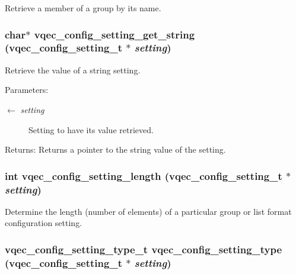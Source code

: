 Retrieve a member of a group by its name. 
\subsubsection{\setlength{\rightskip}{0pt plus 5cm}char$\ast$ vqec\_\-config\_\-setting\_\-get\_\-string (\bf{vqec\_\-config\_\-setting\_\-t} $\ast$ {\em setting})}\label{vqec__config__parser_8c_3b1a12dff91d6b592b26b497ee6bcefe}


Retrieve the value of a string setting.

\begin{Desc}
\item[Parameters:]
\begin{description}
\item[\mbox{$\leftarrow$} {\em setting}]Setting to have its value retrieved. \end{description}
\end{Desc}
\begin{Desc}
\item[Returns:]Returns a pointer to the string value of the setting. \end{Desc}
\subsubsection{\setlength{\rightskip}{0pt plus 5cm}int vqec\_\-config\_\-setting\_\-length (\bf{vqec\_\-config\_\-setting\_\-t} $\ast$ {\em setting})}\label{vqec__config__parser_8c_05aa9a1e8cbfa61f7b11ce785695e742}


Determine the length (number of elements) of a particular group or list format configuration setting. 
\subsubsection{\setlength{\rightskip}{0pt plus 5cm}\bf{vqec\_\-config\_\-setting\_\-type\_\-t} vqec\_\-config\_\-setting\_\-type (\bf{vqec\_\-config\_\-setting\_\-t} $\ast$ {\em setting})}\label{vqec__config__parser_8c_289e2c5093c37152d8c5c02c98f1ddd8}


